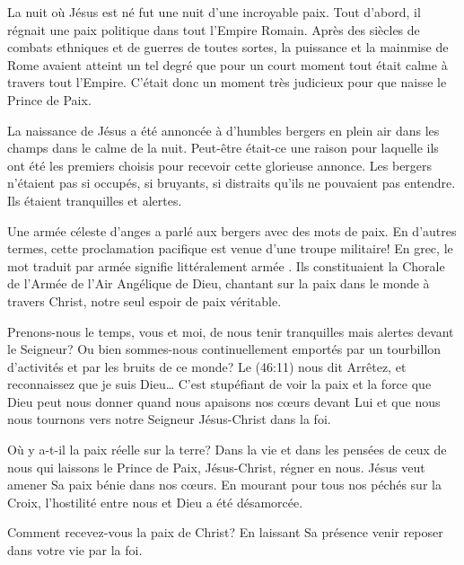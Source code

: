

La nuit où Jésus est né fut une nuit d'une incroyable paix. Tout d'abord, il régnait une paix politique dans tout l'Empire Romain. Après des siècles de combats ethniques et de guerres de toutes sortes, la puissance et la mainmise de Rome avaient atteint un tel degré que pour un court moment tout était calme à travers tout l'Empire. C'était donc un moment très judicieux pour que naisse le Prince de Paix.

La naissance de Jésus a été annoncée à d'humbles bergers en plein air dans les champs dans le calme de la nuit. Peut-être était-ce une raison pour laquelle ils ont été les premiers choisis pour recevoir cette glorieuse annonce. Les bergers n'étaient pas si occupés, si bruyants, si distraits qu'ils ne pouvaient pas entendre. Ils étaient tranquilles et alertes.

Une armée céleste d'anges a parlé aux bergers avec des mots de paix. En d'autres termes, cette proclamation pacifique est venue d'une troupe militaire! En grec, le mot traduit par \Og armée \Fg{} signifie littéralement \Og armée \Fg{}. Ils constituaient la Chorale de l'Armée de l'Air Angélique de Dieu, chantant sur la paix dans le monde à travers Christ, notre seul espoir de paix véritable.

Prenons-nous le temps, vous et moi, de nous tenir tranquilles mais alertes devant le Seigneur? Ou bien sommes-nous continuellement emportés par un tourbillon d'activités et par les bruits de ce monde? Le (46:11) nous dit \Og Arrêtez, et reconnaissez que je suis Dieu\dots{} \Fg{} C'est stupéfiant de voir la paix et la force que Dieu peut nous donner quand nous apaisons nos cœurs devant Lui et que nous nous tournons vers notre Seigneur Jésus-Christ dans la foi.

Où y a-t-il la paix réelle sur la terre? Dans la vie et dans les pensées de ceux de nous qui laissons le Prince de Paix, Jésus-Christ, régner en nous. Jésus veut amener Sa paix bénie dans nos cœurs. En mourant pour tous nos péchés sur la Croix, l'hostilité entre nous et Dieu a été désamorcée.

Comment recevez-vous la paix de Christ? En laissant Sa présence venir reposer dans votre vie par la foi.

\begin{dvquotes}
\end{dvquotes}

